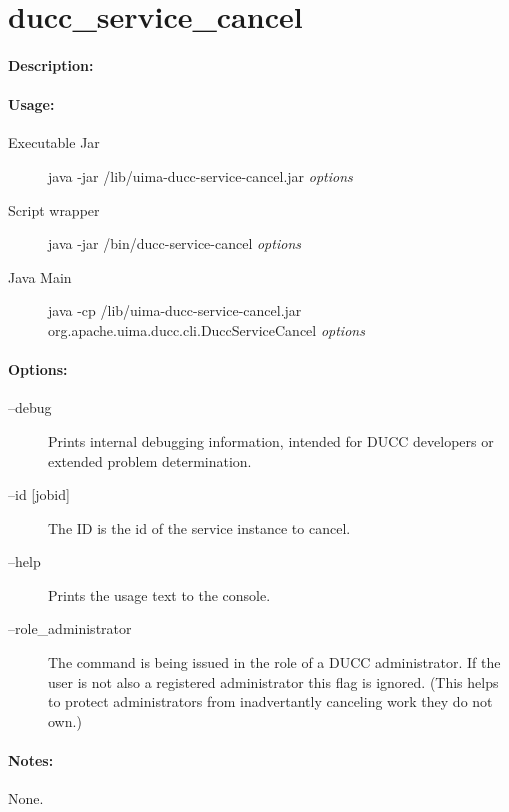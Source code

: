    \section{ducc\_service\_cancel}

    \paragraph{Description:}

    \paragraph{Usage:}
    \begin{description}
    \item[Executable Jar] java -jar \ducchome/lib/uima-ducc-service-cancel.jar {\em options}
    \item[Script wrapper] java -jar \ducchome/bin/ducc-service-cancel {\em options}
    \item[Java Main]      java -cp \ducchome/lib/uima-ducc-service-cancel.jar org.apache.uima.ducc.cli.DuccServiceCancel {\em options}
    \end{description}

    \paragraph{Options:}
    \begin{description}
        \item[--debug ]          
          Prints internal debugging information, intended for DUCC developers or extended problem determination.          
        \item[--id {[jobid]}]
          The ID is the id of the service instance to cancel.
        \item[--help]
          Prints the usage text to the console. 
        \item[--role\_administrator] The command is being issued in the role of a DUCC administrator.
          If the user is not also a registered administrator this flag is ignored.  (This helps to
          protect administrators from inadvertantly canceling work they do not own.)
     \end{description}
        
    \paragraph{Notes:}
    None.

